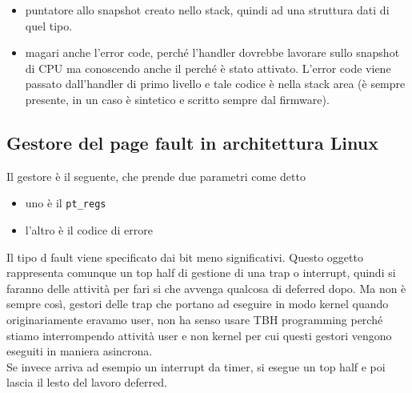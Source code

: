 \documentclass[12pt, oneside]{extbook}
\begin{document}
\begin{itemize}
\item puntatore allo snapshot creato nello stack, quindi ad una struttura dati di quel tipo.
\item magari anche l'error code, perché l'handler dovrebbe lavorare sullo snapshot di CPU ma conoscendo anche il perché è stato attivato. L'error code viene passato dall'handler di primo livello e tale codice è nella stack area (è sempre presente, in un caso è sintetico e scritto sempre dal firmware).
\end{itemize}
\subsection{Gestore del page fault in architettura Linux}
Il gestore è il seguente, che prende due parametri come detto
\begin{itemize}
\item uno è il \texttt{pt\_regs}
\item l'altro è il codice di errore
\end{itemize}
Il tipo d fault viene specificato dai bit meno significativi. Questo oggetto rappresenta comunque un top half di gestione di una trap o interrupt, quindi si faranno delle attività per fari si che avvenga qualcosa di deferred dopo. Ma non è sempre così, gestori delle trap che portano ad eseguire in modo kernel quando originariamente eravamo user, non ha senso usare TBH programming perché stiamo interrompendo attività user e non kernel per cui questi gestori vengono eseguiti in maniera asincrona.\\Se invece arriva ad esempio un interrupt da timer, si esegue un top half e poi lascia il lesto del lavoro deferred.
\end{document}
